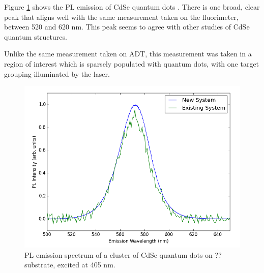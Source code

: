 Figure \ref{fig:pl-adt-qd} shows the PL emission of CdSe quantum dots . There is one broad, clear peak that aligns well with the same measurement taken on the fluorimeter, between 520 and 620 nm. This peak seems to agree with other studies of CdSe quantum structures.\cite{empedocles_photoluminescence_1996}

Unlike the same measurement taken on ADT, this measurement was taken in a region of interest which is sparsely populated with quantum dots, with one target grouping illuminated by the laser.


\begin{figure}[h]
    \centering
    \includegraphics[width=\textwidth]{./img/qd-2.png}
    \caption{PL emission spectrum of a cluster of CdSe quantum dots on ?? substrate, excited at 405 nm.}
    \label{fig:pl-adt-qd}
\end{figure}
